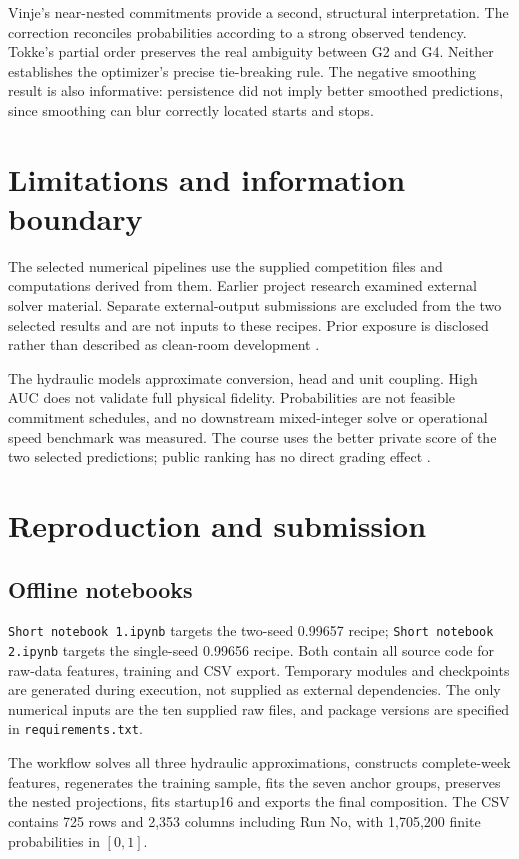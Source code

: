 \documentclass[a4paper,11pt]{article}
\begin{document}
Vinje's near-nested commitments provide a second, structural interpretation. The correction reconciles probabilities according to a strong observed tendency. Tokke's partial order preserves the real ambiguity between G2 and G4. Neither establishes the optimizer's precise tie-breaking rule. The negative smoothing result is also informative: persistence did not imply better smoothed predictions, since smoothing can blur correctly located starts and stops.

\section{Limitations and information boundary}
The selected numerical pipelines use the supplied competition files and computations derived from them. Earlier project research examined external solver material. Separate external-output submissions are excluded from the two selected results and are not inputs to these recipes. Prior exposure is disclosed rather than described as clean-room development \cite{boundary}.

The hydraulic models approximate conversion, head and unit coupling. High AUC does not validate full physical fidelity. Probabilities are not feasible commitment schedules, and no downstream mixed-integer solve or operational speed benchmark was measured. The course uses the better private score of the two selected predictions; public ranking has no direct grading effect \cite{grading}.

\section{Reproduction and submission}
\subsection*{Offline notebooks}
\texttt{Short notebook 1.ipynb} targets the two-seed 0.99657 recipe; \texttt{Short notebook 2.ipynb} targets the single-seed 0.99656 recipe. Both contain all source code for raw-data features, training and CSV export. Temporary modules and checkpoints are generated during execution, not supplied as external dependencies. The only numerical inputs are the ten supplied raw files, and package versions are specified in \texttt{requirements.txt}.

The workflow solves all three hydraulic approximations, constructs complete-week features, regenerates the training sample, fits the seven anchor groups, preserves the nested projections, fits startup16 and exports the final composition. The CSV contains 725 rows and 2,353 columns including Run No, with 1,705,200 finite probabilities in $[0,1]$.
\end{document}
